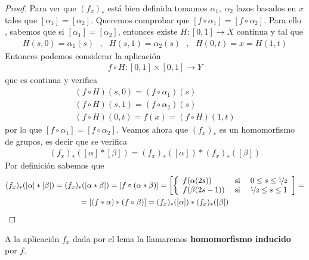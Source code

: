 \begin{lema}
    \begin{proof}
        Para ver que $(f_x)_*$ está bien definida tomamos $\alpha_1,\ \alpha_2$ lazos basados en $x$ tales que $[\alpha_1] = [\alpha_2]$. Queremos comprobar que $[f\circ \alpha_1] = [f\circ \alpha_2]$. Para ello , sabemos que si $[\alpha_1] = [\alpha_2]$, entonces existe $H:[0,1]\to X$ continua y tal que
        \begin{gather*}
            H(s,0) =\alpha_1(s)\ \ \  ,\ \ \ H(s,1) = \alpha_2(s)\ \ \ , \ \ \ H(0,t)=x=H(1,t)
        \end{gather*}
        Entonces podemos considerar la aplicación 
        \begin{align*}
            f\circ H : [0,1]\times [0,1] \to Y
        \end{align*}
        que es continua y verifica 
        \begin{gather*}
            (f\circ H) (s,0) = (f \circ \alpha_1)(s)\\
            (f\circ H) (s,1) = (f\circ \alpha_2)(s)\\
            (f\circ H) (0,t) = f(x) = (f\circ H) (1,t)
        \end{gather*}
        por lo que $[f\circ \alpha_1] = [f\circ \alpha_2]$. Veamos ahora que $(f_x)_*$ es un homomorfismo de grupos, es decir que se verifica
        \begin{gather*}
            (f_x)_* ([\alpha] \ast [\beta] ) = (f_x)_* ([\alpha]) \ast (f_x)_* ([\beta])
        \end{gather*}
        Por definición sabemos que 
        \begin{gather*}
            (f_x)_* ([\alpha] \ast [\beta] ) = (f_x)_*([\alpha \ast \beta]) = [f\circ(\alpha \ast \beta)] = \left[\left\{
                \begin{array}{l c c}
                    f(\alpha(2s)) & \text{ si } & 0\leq s \leq \nicefrac{1}{2}\\
                    f(\beta(2s-1)) & \text{ si } & \nicefrac{1}{2} \leq s \leq 1\\
                \end{array}
            \right.\right]=\\
            =[(f\ast \alpha) \ast (f\circ \beta)] = (f_x)_* ([\alpha]) \ast (f_x)_* ([\beta])
        \end{gather*}
    \end{proof}
\end{lema}

\begin{definicion}
    A la aplicación $f_x$ dada por el lema la llamaremos \textbf{homomorfismo inducido} por $f$.
\end{definicion}

